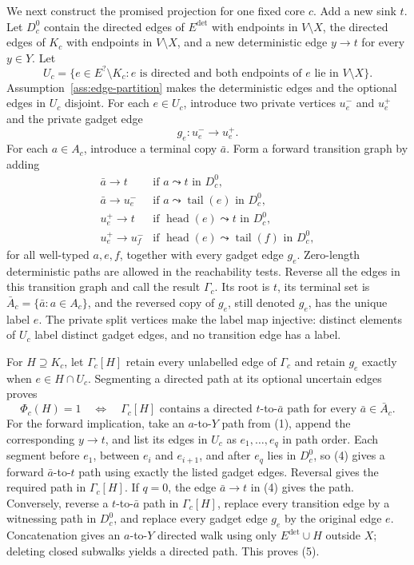 We next construct the promised projection for one fixed core \(c\).  Add a new sink \(t\).  Let \(D_c^0\) contain the directed edges of \(E^{\mathrm{det}}\) with endpoints in \(V\setminus X\), the directed edges of \(K_c\) with endpoints in \(V\setminus X\), and a new deterministic edge \(y\to t\) for every \(y\in Y\).  Let
\[
 U_c=\{e\in E^{?}\setminus K_c:e\text{ is directed and both endpoints of }e
 \text{ lie in }V\setminus X\}.
\]
Assumption~\ref{ass:edge-partition} makes the deterministic edges and the optional edges in \(U_c\) disjoint.  For each \(e\in U_c\), introduce two private vertices \(u_e^-\) and \(u_e^+\) and the private gadget edge
\[
 g_e:u_e^-\longrightarrow u_e^+.
\]
For each \(a\in A_c\), introduce a terminal copy \(\bar a\).  Form a forward transition graph by adding
\[
 \begin{array}{ll}
 \bar a\to t &\text{if }a\leadsto t\text{ in }D_c^0,\\
 \bar a\to u_e^- &\text{if }a\leadsto \operatorname{tail}(e)\text{ in }D_c^0,\\
 u_e^+\to t &\text{if }\operatorname{head}(e)\leadsto t\text{ in }D_c^0,\\
 u_e^+\to u_f^- &\text{if }\operatorname{head}(e)\leadsto \operatorname{tail}(f)
                    \text{ in }D_c^0,
 \end{array}
 \tag{4}
\]
for all well-typed \(a,e,f\), together with every gadget edge \(g_e\).  Zero-length deterministic paths are allowed in the reachability tests.  Reverse all the edges in this transition graph and call the result \(\Gamma_c\).  Its root is \(t\), its terminal set is \(\bar A_c=\{\bar a:a\in A_c\}\), and the reversed copy of \(g_e\), still denoted \(g_e\), has the unique label \(e\).  The private split vertices make the label map injective: distinct elements of \(U_c\) label distinct gadget edges, and no transition edge has a label.

For \(H\supseteq K_c\), let \(\Gamma_c[H]\) retain every unlabelled edge of \(\Gamma_c\) and retain \(g_e\) exactly when \(e\in H\cap U_c\).  Segmenting a directed path at its optional uncertain edges proves
\[
 \Phi_c(H)=1
 \quad\Longleftrightarrow\quad
 \Gamma_c[H]\text{ contains a directed }t\text{-to-}\bar a\text{ path for every }
 \bar a\in\bar A_c.
 \tag{5}
\]
For the forward implication, take an \(a\)-to-\(Y\) path from (1), append the corresponding \(y\to t\), and list its edges in \(U_c\) as \(e_1,\ldots,e_q\) in path order.  Each segment before \(e_1\), between \(e_i\) and \(e_{i+1}\), and after \(e_q\) lies in \(D_c^0\), so (4) gives a forward \(\bar a\)-to-\(t\) path using exactly the listed gadget edges.  Reversal gives the required path in \(\Gamma_c[H]\).  If \(q=0\), the edge \(\bar a\to t\) in (4) gives the path.  Conversely, reverse a \(t\)-to-\(\bar a\) path in \(\Gamma_c[H]\), replace every transition edge by a witnessing path in \(D_c^0\), and replace every gadget edge \(g_e\) by the original edge \(e\).  Concatenation gives an \(a\)-to-\(Y\) directed walk using only \(E^{\mathrm{det}}\cup H\) outside \(X\); deleting closed subwalks yields a directed path.  This proves (5).

